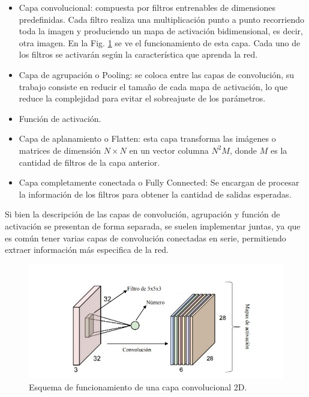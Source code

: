 \begin{itemize}
    \item Capa convolucional: compuesta por filtros entrenables de dimensiones predefinidas. Cada filtro realiza una multiplicación punto a punto recorriendo toda la imagen y produciendo un mapa de activación bidimensional, es decir, otra imagen.
          En la Fig. \ref{fig:esquema-capa-convolucional} se ve el funcionamiento de esta capa. Cada uno de los filtros se activarán según la característica que aprenda la red.
    \item Capa de agrupación o Pooling: se coloca entre las capas de convolución, su trabajo consiste en reducir el tamaño de cada mapa de activación, lo que reduce la complejidad para evitar el sobreajuste de los parámetros.
    \item Función de activación.
    \item Capa de aplanamiento o Flatten: esta capa transforma las imágenes o matrices de dimensión $N \times N$ en un vector columna $N^2M$, donde $M$ es la cantidad de filtros de la capa anterior.
    \item Capa completamente conectada o Fully Connected: Se encargan de procesar la información de los filtros para obtener la cantidad de salidas esperadas.
\end{itemize}

Si bien la descripción de las capas de convolución, agrupación y función de activación se presentan de forma separada, se suelen implementar juntas, ya que es común tener varias capas de convolución conectadas en serie, permitiendo extraer información más especifica de la red.

\begin{figure}[bth]
    \centering
    \includegraphics[width=1\textwidth]{imgs/capa-convolucional.jpeg}
    \caption{Esquema de funcionamiento de una capa convolucional 2D.}
    \label{fig:esquema-capa-convolucional}
\end{figure}

